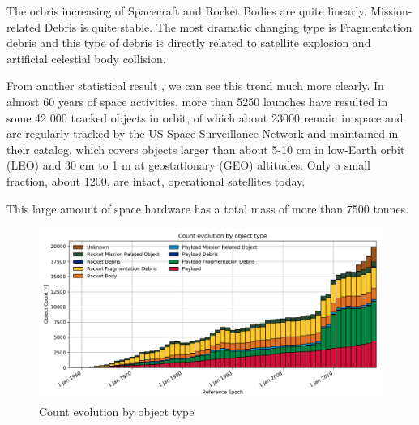 The orbris increasing of Spacecraft and Rocket Bodies are quite linearly. Mission-related Debris is quite stable. The most dramatic changing type is Fragmentation debris and this type of debris is directly related to satellite explosion and artificial celestial body collision.


From another statistical result , we can see this trend much more clearly. In almost 60 years of space activities, more than 5250 launches have resulted in some 42 000 tracked objects in orbit, of which about 23000 remain in space and are regularly tracked by the US Space Surveillance Network and maintained in their catalog, which covers objects larger than about 5-10 cm in low-Earth orbit (LEO) and 30 cm to 1 m at geostationary (GEO) altitudes. Only a small fraction, about 1200, are intact, operational satellites today.

This large amount of space hardware has a total mass of more than 7500 tonnes.

\begin{figure}[ht]
\centering
\includegraphics[width=\textwidth]{fig/motivation/all_evo_type_count}
\caption{Count evolution by object type\cite{ESAspacedebris}}
\label{moti-all_evo_type_count}
\end{figure}

